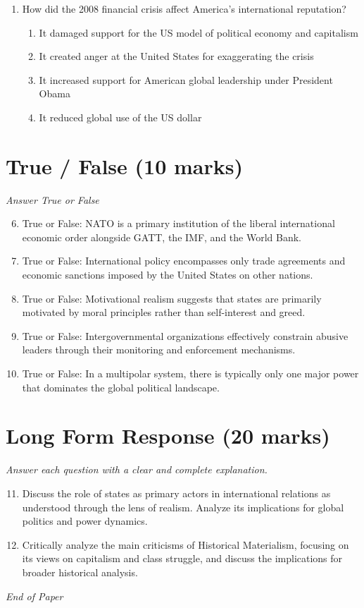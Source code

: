 \documentclass[12pt]{article}
\begin{document}
\begin{enumerate}[label=\arabic*.]
\begin{enumerate}[label=(\alph*)]
    \item Smart bomb.
    \item Precision target.
\end{enumerate}
\item How did the 2008 financial crisis affect America's international reputation?
\begin{enumerate}[label=(\alph*)]
    \item It damaged support for the US model of political economy and capitalism
    \item It created anger at the United States for exaggerating the crisis
    \item It increased support for American global leadership under President Obama
    \item It reduced global use of the US dollar
\end{enumerate}
\end{enumerate}

\section*{True / False (10 marks)}
\textit{Answer True or False}
\begin{enumerate}[label=\arabic*.]
\setcounter{enumi}{5}
\item True or False: NATO is a primary institution of the liberal international economic order alongside GATT, the IMF, and the World Bank.
\item True or False: International policy encompasses only trade agreements and economic sanctions imposed by the United States on other nations.
\item True or False: Motivational realism suggests that states are primarily motivated by moral principles rather than self-interest and greed.
\item True or False: Intergovernmental organizations effectively constrain abusive leaders through their monitoring and enforcement mechanisms.
\item True or False: In a multipolar system, there is typically only one major power that dominates the global political landscape.
\end{enumerate}

\section*{Long Form Response (20 marks)}
\textit{Answer each question with a clear and complete explanation.}
\begin{enumerate}[label=\arabic*.]
\setcounter{enumi}{10}
\item Discuss the role of states as primary actors in international relations as understood through the lens of realism. Analyze its implications for global politics and power dynamics.
\item Critically analyze the main criticisms of Historical Materialism, focusing on its views on capitalism and class struggle, and discuss the implications for broader historical analysis.
\end{enumerate}

\vfill
\noindent\textit{End of Paper}
\end{document}
